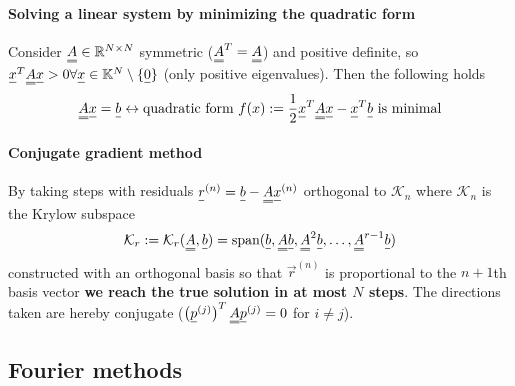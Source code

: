 \paragraph*{Solving a linear system by minimizing the quadratic form}
Consider $\mat{A} \in \mathbb{R}^{N \times N}$ symmetric ($\mat{A}^T = \mat{A}$) and positive definite, so $\vec{x}^T \mat{A} \vec{x} > 0 \forall \vec{x}\in \mathbb{K}^N \setminus \{\vec{0}\}$ (only positive eigenvalues).
Then the following holds
\begin{equation}
    \mat{A}\vec{x} = \vec{b} \leftrightarrow \text{quadratic form } f(x) := \frac{1}{2} \vec{x}^T \mat{A} \vec{x} - \vec{x}^T \vec{b} \text{ is minimal}
\end{equation}

\paragraph*{Conjugate gradient method} By taking steps with 
residuals $\vec{r}^{(n)} = \vec{b} - \mat{A}\vec{x}^{(n)}$ orthogonal to $\mathcal{K}_n$
where $\mathcal{K}_n$ is the Krylow subspace
\begin{equation}
    \mathcal{K}_r := \mathcal{K}_r(\mat{A},\vec{b}) = \text{span} {(\vec{b}, \mat{A}\vec{b}, \mat{A}^2\vec{b}, \dots, \mat{A}^{r-1}\vec{b})}
\end{equation}
constructed with an orthogonal basis so that $\vec{r}^{(n)}$ is proportional
to the $n+1$th basis vector \textbf{we reach the true solution in at most $N$ steps}.
The directions taken are hereby conjugate ($\left(\vec{p}^{(j)} \right)^T \mat{A} \vec{p}^{(j)} = 0$ for $i \ne j$).

\subsection*{Fourier methods}
